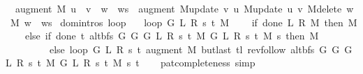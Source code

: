 \begin{isabellebody}
\ \ {\isachardoublequoteopen}augment\ M\ {\isacharparenleft}{\kern0pt}u\ {\isacharhash}{\kern0pt}\ v\ {\isacharhash}{\kern0pt}\ w\ {\isacharhash}{\kern0pt}\ ws{\isacharparenright}{\kern0pt}\ {\isacharequal}{\kern0pt}\ augment\ {\isacharparenleft}{\kern0pt}M{\isacharunderscore}{\kern0pt}update\ v\ u\ {\isacharparenleft}{\kern0pt}M{\isacharunderscore}{\kern0pt}update\ u\ v\ {\isacharparenleft}{\kern0pt}M{\isacharunderscore}{\kern0pt}delete\ w\ M{\isacharparenright}{\kern0pt}{\isacharparenright}{\kern0pt}{\isacharparenright}{\kern0pt}\ {\isacharparenleft}{\kern0pt}w\ {\isacharhash}{\kern0pt}\ ws{\isacharparenright}{\kern0pt}{\isachardoublequoteclose}\isanewline
\isanewline
{}\isamarkupfalse%
\ {\isacharparenleft}{\kern0pt}domintros{\isacharparenright}{\kern0pt}\ loop{\isacharprime}{\kern0pt}\ \isanewline
\ \ {\isachardoublequoteopen}loop{\isacharprime}{\kern0pt}\ G\ L\ R\ s\ t\ M\ {\isacharequal}{\kern0pt}\isanewline
\ \ \ {\isacharparenleft}{\kern0pt}if\ done{\isacharunderscore}{\kern0pt}{}\ L\ R\ M\ then\ M\isanewline
\ \ \ \ else\ if\ done{\isacharunderscore}{\kern0pt}{}\ t\ {\isacharparenleft}{\kern0pt}alt{\isacharunderscore}{\kern0pt}bfs\ {\isacharparenleft}{\kern0pt}G{}\ G\ {\isacharparenleft}{\kern0pt}G{}\ L\ R\ s\ t\ M{\isacharparenright}{\kern0pt}{\isacharparenright}{\kern0pt}\ {\isacharparenleft}{\kern0pt}G{}\ L\ R\ s\ t\ M{\isacharparenright}{\kern0pt}\ s{\isacharparenright}{\kern0pt}\ then\ M\isanewline
\ \ \ \ \ \ \ \ \ else\ loop{\isacharprime}{\kern0pt}\ G\ L\ R\ s\ t\ {\isacharparenleft}{\kern0pt}augment\ M\ {\isacharparenleft}{\kern0pt}butlast\ {\isacharparenleft}{\kern0pt}tl\ {\isacharparenleft}{\kern0pt}rev{\isacharunderscore}{\kern0pt}follow\ {\isacharparenleft}{\kern0pt}alt{\isacharunderscore}{\kern0pt}bfs\ {\isacharparenleft}{\kern0pt}G{}\ G\ {\isacharparenleft}{\kern0pt}G{}\ L\ R\ s\ t\ M{\isacharparenright}{\kern0pt}{\isacharparenright}{\kern0pt}\ {\isacharparenleft}{\kern0pt}G{}\ L\ R\ s\ t\ M{\isacharparenright}{\kern0pt}\ s{\isacharparenright}{\kern0pt}\ t{\isacharparenright}{\kern0pt}{\isacharparenright}{\kern0pt}{\isacharparenright}{\kern0pt}{\isacharparenright}{\kern0pt}{\isacharparenright}{\kern0pt}{\isachardoublequoteclose}\isanewline
%
\isadelimproof
\ \ %
\endisadelimproof
%
\isatagproof
{}\isamarkupfalse%
\ pat{\isacharunderscore}{\kern0pt}completeness\ simp%
\endisatagproof
{\isafoldproof}%
%
\isadelimproof
\isanewline
%
\endisadelimproof
\isanewline
\isanewline
{}\isamarkupfalse%

\end{isabellebody}

